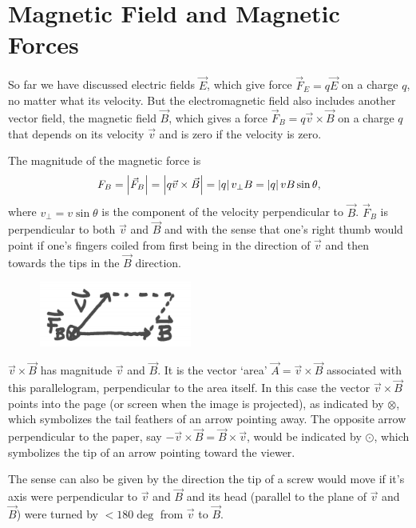 \chapter{Magnetic Field and Magnetic Forces}
So far we have discussed electric fields $\vec{E}$, which give force $\vec{F}_E = q \vec{E}$ on a charge $q$, no matter what its velocity. But the electromagnetic field also includes another vector field, the magnetic field $\vec{B}$, which gives a force $\vec{F}_B = q\vec{v} \times \vec{B}$ on a charge $q$ that depends on its velocity $\vec{v}$ and is zero if the velocity is zero. 

The magnitude of the magnetic force is 
\begin{equation}
F_B = \left| \vec{F}_B \right| = \left| q\vec{v}\times \vec{B} \right| = \left| q \right|v_\perp B = \left| q \right|vB \sin \theta,
\end{equation}
where $v_\perp = v \sin \theta$ is the component of the velocity perpendicular to $\vec{B}$. $\vec{F}_B$ is perpendicular to both $\vec{v}$ and $\vec{B}$ and with the sense that one's right thumb would point if one's fingers coiled from first being in the direction of $\vec{v}$ and then towards the tips in the $\vec{B}$ direction. 

\begin{figure}
\centering
\includegraphics[width=5cm]{Images/chap7_1.png}
\end{figure}

$\vec{v} \times \vec{B}$ has magnitude $\vec{v}$ and $\vec{B}$. It is the vector `area' $\vec{A} = \vec{v} \times \vec{B}$ associated with this parallelogram, perpendicular to the area itself. In this case the vector $\vec{v} \times \vec{B}$ points into the page (or screen when the image is projected), as indicated by $\otimes$, which symbolizes the tail feathers of an arrow pointing away. The opposite arrow perpendicular to the paper, say $-\vec{v} \times \vec{B} = \vec{B} \times \vec{v}$, would be indicated by $\odot$, which symbolizes the tip of an arrow pointing toward the viewer.

The sense can also be given by the direction the tip of a screw would move if it's axis were perpendicular to $\vec{v}$ and $\vec{B}$ and its head (parallel to the plane of $\vec{v}$ and $\vec{B}$) were turned by $<180\deg$ from $\vec{v}$ to $\vec{B}$.

